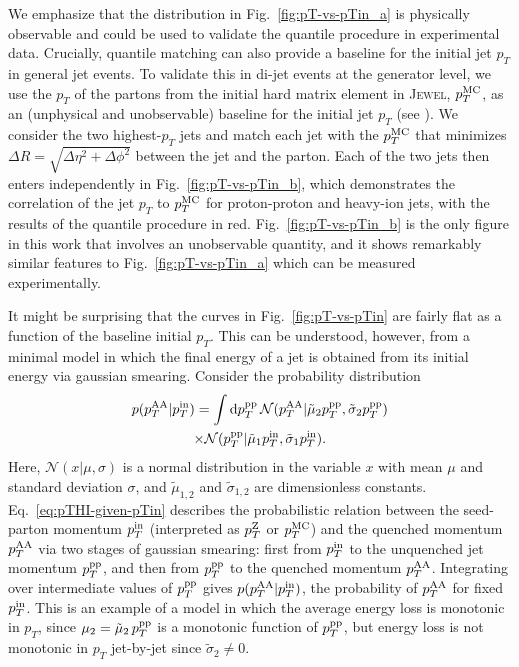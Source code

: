 \documentclass[aps,prl,twocolumn,preprintnumbers,superscriptaddress,showpacs,floatfix, nofootinbib]{revtex4-1}
\newcommand{\pTZ}{p_T^{\rm Z}}
\newcommand{\pTin}{p_T^{\rm in}}
\newcommand{\pTMC}{p_T^{\rm MC}}
\newcommand{\pTHI}{p_T^{\rm AA}}
\newcommand{\pTvac}{p_T^{\rm pp}}
\newcommand{\Eq}[1]{Eq.~\eqref{#1}}
\newcommand{\Fig}[1]{Fig.~\ref{#1}}
\newcommand{\df}{\text{d}}
\begin{document}
We emphasize that the distribution in \Fig{fig:pT-vs-pTin_a} is physically observable and could be used to validate the quantile procedure in experimental data.
%
Crucially, quantile matching can also provide a baseline for the initial jet $p_T$ in general jet events.
%
To validate this in di-jet events at the generator level, we use the $p_T$ of the partons from the initial hard matrix element in \textsc{Jewel}, $\pTMC$, as an (unphysical and unobservable) baseline for the initial jet $p_T$ (see \cite{Milhano:2015mng}).
%
We consider the two highest-$p_T$ jets and match each jet with the $\pTMC$ that minimizes $\Delta R = \sqrt{\Delta \eta^2 + \Delta \phi^2}$ between the jet and the parton.
%
Each of the two jets then enters independently in \Fig{fig:pT-vs-pTin_b}, which demonstrates the correlation of the jet $p_T$ to $\pTMC$ for proton-proton and heavy-ion jets, with the results of the quantile procedure in red.
%
\Fig{fig:pT-vs-pTin_b} is the only figure in this work that involves an unobservable quantity, and it shows remarkably similar features to \Fig{fig:pT-vs-pTin_a} which can be measured experimentally.


It might be surprising that the curves in \Fig{fig:pT-vs-pTin} are fairly flat as a function of the baseline initial $p_T$.
%
This can be understood, however, from a minimal model in which the final energy of a jet is obtained from its initial energy via gaussian smearing.
%
Consider the probability distribution
%
\begin{multline}
	\label{eq:pTHI-given-pTin}
	p( \pTHI | \pTin) = \int \df \pTvac \,  \mathcal{N}( \pTHI | \tilde{\mu}_2 \pTvac,\tilde{\sigma}_2 \pTvac) \\
	\times \mathcal{N}(\pTvac | \tilde{\mu}_1 \pTin,\tilde{\sigma}_1 \pTin).
\end{multline}
%
Here, $\mathcal{N}(x | \mu,\sigma)$ is a normal distribution in the variable $x$ with mean $\mu$ and standard deviation $\sigma$, and $\tilde{\mu}_{1,2}$ and $\tilde{\sigma}_{1,2}$ are dimensionless constants.
%
\Eq{eq:pTHI-given-pTin} describes the probabilistic relation between the seed-parton momentum $\pTin$ (interpreted as $\pTZ$ or $\pTMC$) and the quenched momentum $\pTHI$ via two stages of gaussian smearing: first from $\pTin$ to the unquenched jet momentum $\pTvac$, and then from $\pTvac$ to the quenched momentum $\pTHI$.
%
Integrating over intermediate values of $\pTvac$ gives $p(\pTHI|\pTin)$, the probability of $\pTHI$ for fixed $\pTin$.
%
This is an example of a model in which the average energy loss is monotonic in $p_T$, since $\mu_2 = \tilde{\mu}_2 \, \pTvac$ is a monotonic function of $\pTvac$, but energy loss is not monotonic in $p_T$ jet-by-jet since $\tilde{\sigma}_2 \neq 0$.
\end{document}
